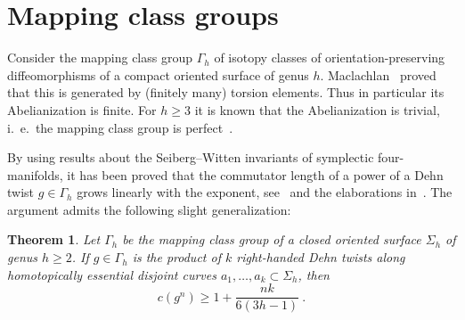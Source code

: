 \documentclass[12pt]{amsart}
\newtheorem{thm}{Theorem}
\theoremstyle{remark}
\theoremstyle{definition}
\begin{document}
\section{Mapping class groups}\label{s:map}
    
Consider the mapping class group $\Gamma_{h}$ of isotopy classes of 
orientation-preserving diffeomorphisms of a compact 
oriented surface of genus $h$. Maclachlan~\cite{Mac} proved that this 
is generated by (finitely many) torsion elements. Thus in particular its
Abelianization is finite. For $h\geq 3$ it is known that the 
Abelianization is trivial, i.~e.~the mapping class group is 
perfect~\cite{Powell}.

By using results about the Seiberg--Witten invariants of symplectic 
four-manifolds, it has been proved that the commutator length of a power of 
a Dehn twist $g\in\Gamma_{h}$ grows linearly with the exponent, see~\cite{EK} 
and the elaborations in~\cite{BK,Kork}. The argument 
admits the following slight generalization:
\begin{thm}\label{t:main}
    Let $\Gamma_{h}$ be the mapping class group of a closed oriented 
    surface $\Sigma_{h}$ of genus $h\geq 2$. If $g\in\Gamma_{h}$ is the product 
    of $k$ right-handed Dehn twists along homotopically essential 
    disjoint curves $a_{1},\ldots,a_{k}\subset\Sigma_{h}$, then 
    \begin{equation}\label{eq:bound}
c(g^{n})\geq 1+\frac{nk}{6(3h-1)} \ .
\end{equation}
    \end{thm}
\end{document}
